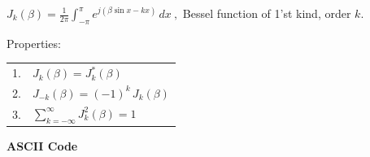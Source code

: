 \documentclass[12pt]{article}
\begin{document}
\noindent $\displaystyle J_k(\beta)=\frac{1}{2\pi}\int_{-\pi}^{\pi}
e^{j(\beta\sin x-k x)}\,dx\>,$ Bessel function of 1'st kind, order $k$.
\bigskip

\noindent Properties:
\medskip

\begin{tabular}{rl}
1.&$J_k(\beta)=J^*_k(\beta)$\\[6pt]
2.&$J_{-k}(\beta)=(-1)^k\, J_k(\beta)$\\[6pt]
3.&$\displaystyle\sum_{k=-\infty}^{\infty} J_k^2(\beta)=1$
\end{tabular}

\vfill
\eject

\begin{large}
\textbf{ASCII Code}
\end{large}
\medskip
\bigskip
\end{document}
